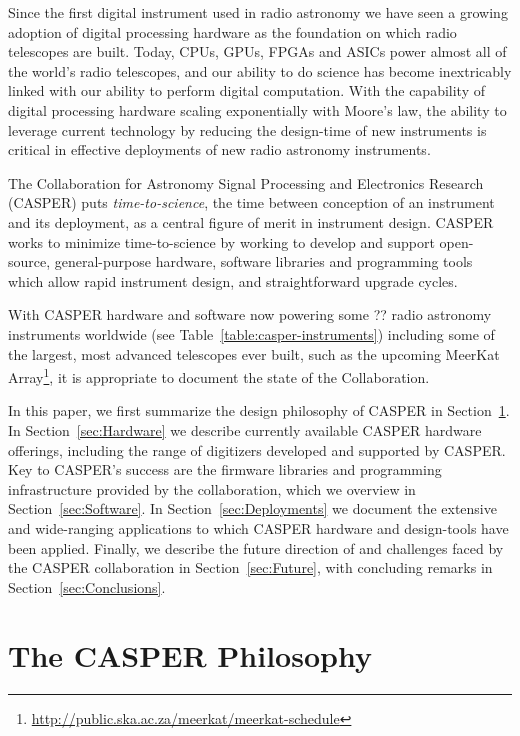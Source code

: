 \documentclass{ws-jai}
\begin{document}
Since the first digital instrument used in radio astronomy \citep{Weinreb} we
have seen a growing adoption of digital processing hardware as the foundation on
which radio telescopes are built.  Today, CPUs, GPUs, FPGAs and ASICs power
almost all of the world's radio telescopes, and our ability to do science has
become inextricably linked with our ability to perform digital computation.
With the capability of digital processing hardware scaling exponentially with
Moore's law, the ability to leverage current technology by reducing the
design-time of new instruments is critical in effective deployments of new radio
astronomy instruments.

The Collaboration for Astronomy Signal Processing and Electronics Research
(CASPER) puts \emph{time-to-science}, the time between conception of an
instrument and its deployment, as a central figure of merit in instrument
design. CASPER works to minimize time-to-science by working to develop and
support open-source, general-purpose hardware, software libraries and
programming tools which allow rapid instrument design, and straightforward
upgrade cycles.

With CASPER hardware and software now powering some ?? radio astronomy
instruments worldwide (see Table~\ref{table:casper-instruments}) including some
of the largest, most advanced telescopes ever built, such as the upcoming
MeerKat Array\footnote{\url{http://public.ska.ac.za/meerkat/meerkat-schedule}}, it is appropriate to document the state of the
Collaboration.

In this paper, we first summarize the design philosophy of CASPER in
Section~\ref{sec:CASPER-philosophy}.  In Section~\ref{sec:Hardware} we describe
currently available CASPER hardware offerings, including the range of digitizers
developed and supported by CASPER. Key to CASPER's success are the firmware
libraries and programming infrastructure provided by the collaboration, which we
overview in Section~\ref{sec:Software}.  In Section~\ref{sec:Deployments} we
document the extensive and wide-ranging applications to which CASPER hardware
and design-tools have been applied. Finally, we describe the future direction of
and challenges faced by the CASPER collaboration in Section~\ref{sec:Future},
with concluding remarks in Section~\ref{sec:Conclusions}.

\section{The CASPER Philosophy} \label{sec:CASPER-philosophy}
\end{document}
